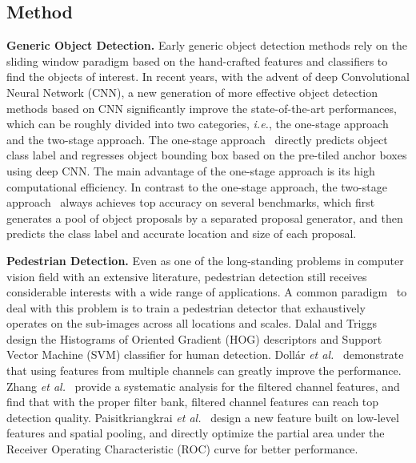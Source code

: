 \documentclass[journal]{IEEEtran}
\def\ie{{\em i.e.}}
\def\etal{{\em et al.}}
\begin{document}
\subsection{Method}
{\flushleft \textbf{Generic Object Detection.}}
Early generic object detection methods rely on the sliding window paradigm based on the hand-crafted features and classifiers to find the objects of interest. In recent years, with the advent of deep Convolutional Neural Network (CNN), a new generation of more effective object detection methods based on CNN significantly improve the state-of-the-art performances, which can be roughly divided into two categories, \ie, the one-stage approach and the two-stage approach. The one-stage approach~\cite{DBLP:conf/eccv/LiuAESRFB16,DBLP:conf/cvpr/ZhangSF18} directly predicts object class label and regresses object bounding box based on the pre-tiled anchor boxes using deep CNN. The main advantage of the one-stage approach is its high computational efficiency. In contrast to the one-stage approach, the two-stage approach~\cite{DBLP:journals/pami/RenHG017, DBLP:journals/tmm/LiWLDXFY17} always achieves top accuracy on several benchmarks, which first generates a pool of object proposals by a separated proposal generator, and then predicts the class label and accurate location and size of each proposal.

{\flushleft \textbf{Pedestrian Detection.}}
Even as one of the long-standing problems in computer vision field with an extensive literature, pedestrian detection still receives considerable interests with a wide range of applications. A common paradigm~\cite{DBLP:conf/bmvc/DollarTPB09,DBLP:conf/cvpr/YanZLLL13,DBLP:conf/cvpr/ZhangBC14} to deal with this problem is to train a pedestrian detector that exhaustively operates on the sub-images across all locations and scales. Dalal and Triggs~\cite{DBLP:conf/cvpr/DalalT05} design the Histograms of Oriented Gradient (HOG) descriptors and Support Vector Machine (SVM) classifier for human detection. Doll{\'{a}}r \etal~\cite{DBLP:journals/pami/DollarABP14} demonstrate that using features from multiple channels can greatly improve the performance. Zhang \etal~\cite{DBLP:conf/cvpr/ZhangBS15} provide a systematic analysis for the filtered channel features, and find that with the proper filter bank, filtered channel features can reach top detection quality. Paisitkriangkrai \etal~\cite{DBLP:conf/eccv/PaisitkriangkraiSH14} design a new feature built on low-level features and spatial pooling, and directly optimize the partial area under the Receiver Operating Characteristic (ROC) curve for better performance.
\end{document}
